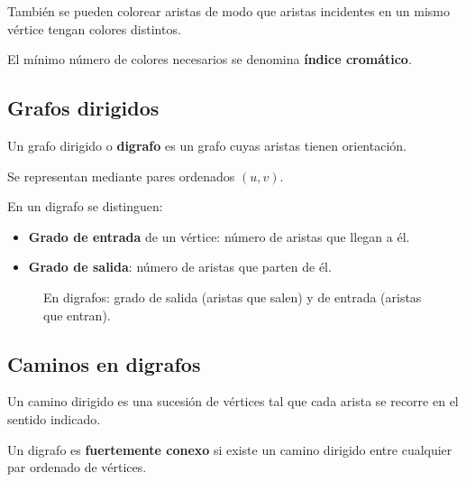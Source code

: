 \documentclass[12pt]{article}
\theoremstyle{plain}
\theoremstyle{definition}
\theoremstyle{remark}
\begin{document}
También se pueden colorear aristas de modo que aristas incidentes en un mismo vértice tengan colores distintos.

El mínimo número de colores necesarios se denomina \textbf{índice cromático}.

\subsection*{Grafos dirigidos}

Un grafo dirigido o \textbf{digrafo} es un grafo cuyas aristas tienen orientación.

Se representan mediante pares ordenados $(u,v)$.

En un digrafo se distinguen:

\begin{itemize}
    \item \textbf{Grado de entrada} de un vértice: número de aristas que llegan a él.
    \item \textbf{Grado de salida}: número de aristas que parten de él.
\end{itemize}

\begin{figure}[htbp]
\centering
{}
\caption{En digrafos: grado de salida (aristas que salen) y de entrada (aristas que entran).}
\end{figure}

\subsection*{Caminos en digrafos}

Un camino dirigido es una sucesión de vértices tal que cada arista se recorre en el sentido indicado.

Un digrafo es \textbf{fuertemente conexo} si existe un camino dirigido entre cualquier par ordenado de vértices.
\end{document}
